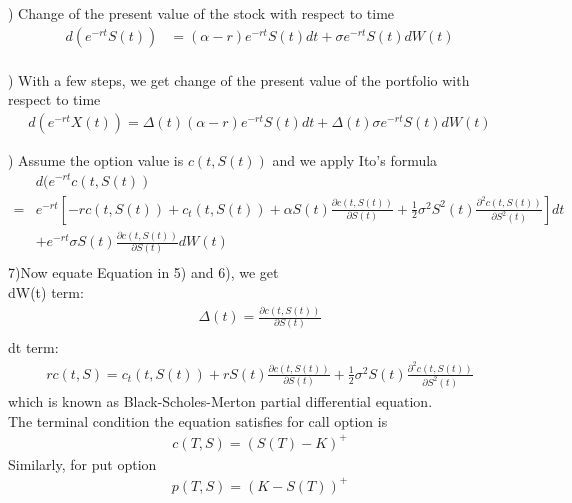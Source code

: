 \documentclass[a4paper]{article}
\begin{document}
) Change of the present value of the stock with respect to time\\
\begin{align*}
	d(e^{-r t} S(t)) & = (\alpha - r) e^{- r t}S(t) dt + \sigma e^{- r t} S(t) dW(t) \\
\end{align*}

) With a few steps, we get change of the present value of the portfolio with respect to time\\
\begin{align}\label{discounted X}
  d(e^{- r t} X(t)) 
 =  \Delta(t) (\alpha - r) e^{-rt} S(t) dt + \Delta(t) \sigma e^{-rt} S(t) dW(t)
\end{align}

) Assume the option value is $c(t,S(t))$ and we apply Ito's formula\\
\begin{align*}
	& d(e^{-rt } c(t, S(t)) \\
= & e^{-rt} [- r c(t, S(t)) + c_t(t, S(t)) + \alpha S(t) \frac{\partial c(t, S(t))}{\partial S(t)}  +\frac{1}{2} \sigma^2 S^2(t) \frac{\partial^2 c(t, S(t))}{\partial S^2(t)} ] dt\\
  & +e^{-rt} \sigma S(t)  \frac{\partial c(t, S(t))}{\partial S(t)} dW(t)\\
\end{align*}
7)\noindent	Now equate Equation in 5) and 6), we get\\
dW(t) term:
\begin{align*}
	\Delta(t) = \frac{\partial c(t,S(t))}{\partial S(t)} \\	
\end{align*}
dt term:
\begin{align}\label{BSM}
	rc(t, S)  = c_t (t, S(t)) 
	+ r S(t) \frac{\partial c(t, S(t))}{\partial S(t)}+ \frac{1}{2} \sigma^2 S(t) \frac{\partial^2 c(t, S(t))}{\partial S^2(t)}  
\end{align}
which is known as Black-Scholes-Merton partial differential equation.\\
The terminal condition the equation satisfies for call option is
\begin{align*}
	c(T,S) = (S(T)-K)^+
\end{align*}
Similarly, for put option
\begin{align*}
	p(T,S) = (K-S(T))^+
\end{align*}
\end{document}
